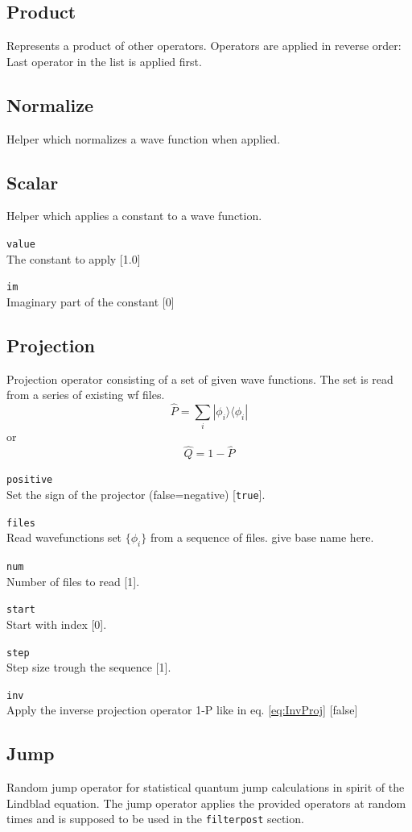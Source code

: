\documentclass[a4paper,12pt]{scrbook}
\newcommand{\option}[2]{\item \texttt{#1}\\ #2}
\newcommand{\code}[1]{\texttt{#1}}
\begin{document}
\subsection{Product}
Represents a product of other operators.
Operators are applied in reverse order: Last operator in the list is applied first.

\subsection{Normalize}
Helper which normalizes a wave function when applied.

\subsection{Scalar}
Helper which applies a constant to a wave function.
\begin{options}
 \option{value}{The constant to apply [1.0]}
 \option{im}{Imaginary part of the constant [0]}
\end{options}

\subsection{Projection}
Projection operator consisting of a set of given wave functions. The set is read from
a series of existing wf files.
\begin{equation}
 \hat P = \sum_i |\phi_i\rangle \langle \phi_i|
\end{equation}
or
\begin{equation}
 \label{eq:InvProj}
 \hat Q = 1 - \hat P
\end{equation}
\begin{options}
\option{positive}{Set the sign of the projector (false=negative) [\code{true}].}
\option{files}{Read wavefunctions set $\{\phi_i\}$ from a sequence of files. give base name here.}
\option{num}{Number of files to read [1].}
\option{start}{Start with index [0].}
\option{step}{Step size trough the sequence [1].}
\option{inv}{Apply the inverse projection operator 1-P like in eq. \ref{eq:InvProj} [false]}
\end{options}

\subsection{Jump}
Random jump operator for statistical quantum jump calculations in spirit of the
Lindblad equation.
The jump operator applies the provided operators at random times and is supposed
to be used in the \code{filterpost} section.
\end{document}
